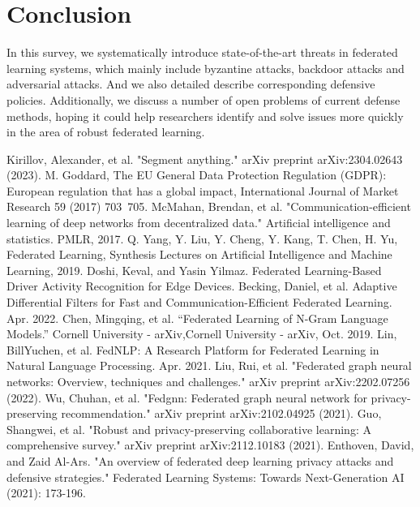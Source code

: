 \documentclass[conference]{IEEEtran}
\begin{document}
\section{Conclusion}
In this survey, we systematically introduce state-of-the-art threats in federated learning systems,
which mainly include byzantine attacks, backdoor attacks and adversarial attacks. 
And we also detailed describe corresponding defensive policies.
Additionally, we discuss a number of open problems of current defense methods,
hoping it could help researchers identify and solve issues more quickly in the area of robust federated learning.



\newpage

\begin{thebibliography}{00}
     Kirillov, Alexander, et al. "Segment anything." arXiv preprint arXiv:2304.02643 (2023).
     M. Goddard, The EU General Data Protection Regulation (GDPR): European regulation that has a global impact, International Journal of Market Research 59 (2017) 703~705.
     McMahan, Brendan, et al. "Communication-efficient learning of deep networks from decentralized data." Artificial intelligence and statistics. PMLR, 2017.
     Q. Yang, Y. Liu, Y. Cheng, Y. Kang, T. Chen, H. Yu, Federated Learning, Synthesis Lectures on Artificial Intelligence and Machine Learning, 2019.
     Doshi, Keval, and Yasin Yilmaz. Federated Learning-Based Driver Activity Recognition for Edge Devices.
     Becking, Daniel, et al. Adaptive Differential Filters for Fast and Communication-Efficient Federated Learning. Apr. 2022.
     Chen, Mingqing, et al. “Federated Learning of N-Gram Language Models.” Cornell University - arXiv,Cornell University - arXiv, Oct. 2019.  
     Lin, BillYuchen, et al. FedNLP: A Research Platform for Federated Learning in Natural Language Processing. Apr. 2021.  
     Liu, Rui, et al. "Federated graph neural networks: Overview, techniques and challenges." arXiv preprint arXiv:2202.07256 (2022).  
     Wu, Chuhan, et al. "Fedgnn: Federated graph neural network for privacy-preserving recommendation." arXiv preprint arXiv:2102.04925 (2021).  
     Guo, Shangwei, et al. "Robust and privacy-preserving collaborative learning: A comprehensive survey." arXiv preprint arXiv:2112.10183 (2021).
     Enthoven, David, and Zaid Al-Ars. "An overview of federated deep learning privacy attacks and defensive strategies." Federated Learning Systems: Towards Next-Generation AI (2021): 173-196.

\end{thebibliography}
\end{document}
